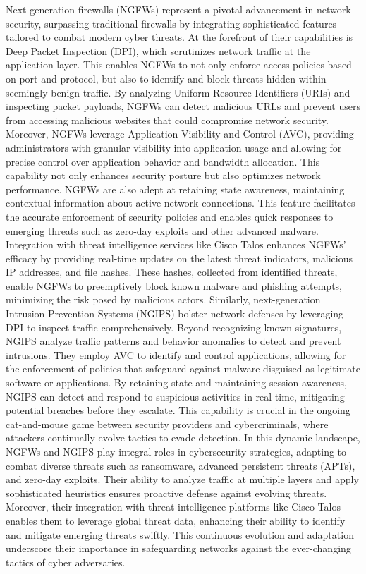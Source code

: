 \documentclass{article}
\begin{document}
	Next-generation firewalls (NGFWs) represent a pivotal advancement in network security, surpassing traditional firewalls by integrating sophisticated features tailored to combat modern cyber threats. At the forefront of their capabilities is Deep Packet Inspection (DPI), which scrutinizes network traffic at the application layer. This enables NGFWs to not only enforce access policies based on port and protocol, but also to identify and block threats hidden within seemingly benign traffic. By analyzing Uniform Resource Identifiers (URIs) and inspecting packet payloads, NGFWs can detect malicious URLs and prevent users from accessing malicious websites that could compromise network security. Moreover, NGFWs leverage Application Visibility and Control (AVC), providing administrators with granular visibility into application usage and allowing for precise control over application behavior and bandwidth allocation. This capability not only enhances security posture but also optimizes network performance. NGFWs are also adept at retaining state awareness, maintaining contextual information about active network connections. This feature facilitates the accurate enforcement of security policies and enables quick responses to emerging threats such as zero-day exploits and other advanced malware. Integration with threat intelligence services like Cisco Talos enhances NGFWs' efficacy by providing real-time updates on the latest threat indicators, malicious IP addresses, and file hashes. These hashes, collected from identified threats, enable NGFWs to preemptively block known malware and phishing attempts, minimizing the risk posed by malicious actors. Similarly, next-generation Intrusion Prevention Systems (NGIPS) bolster network defenses by leveraging DPI to inspect traffic comprehensively. Beyond recognizing known signatures, NGIPS analyze traffic patterns and behavior anomalies to detect and prevent intrusions. They employ AVC to identify and control applications, allowing for the enforcement of policies that safeguard against malware disguised as legitimate software or applications. By retaining state and maintaining session awareness, NGIPS can detect and respond to suspicious activities in real-time, mitigating potential breaches before they escalate. This capability is crucial in the ongoing cat-and-mouse game between security providers and cybercriminals, where attackers continually evolve tactics to evade detection. In this dynamic landscape, NGFWs and NGIPS play integral roles in cybersecurity strategies, adapting to combat diverse threats such as ransomware, advanced persistent threats (APTs), and zero-day exploits. Their ability to analyze traffic at multiple layers and apply sophisticated heuristics ensures proactive defense against evolving threats. Moreover, their integration with threat intelligence platforms like Cisco Talos enables them to leverage global threat data, enhancing their ability to identify and mitigate emerging threats swiftly. This continuous evolution and adaptation underscore their importance in safeguarding networks against the ever-changing tactics of cyber adversaries.\\
	
\end{document}
